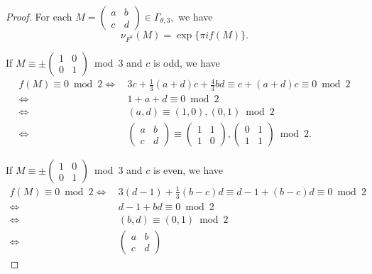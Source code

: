\documentclass[12pt]{article}
\theoremstyle{definition}
\numberwithin{equation}{section}
\numberwithin{theorem}{section}
\begin{document}
\begin{proof}
For each 
$
M
=
\begin{pmatrix}
a & b \\
c & d
\end{pmatrix}
\in
\Gamma_{\theta,3}, 
$ 
we have 
\begin{equation*}
\nu_{F^{k}  }(M)=
\exp
\{\pi i f(M) \}. 
\end{equation*}
\par
If $M \equiv \pm
\begin{pmatrix}
1 & 0 \\
0 & 1
\end{pmatrix}
\bmod{3}
$ 
and $c$ is odd, 
we have 
\begin{align*}
f(M)\equiv 0 \bmod{2}
\Longleftrightarrow& \,
3c+\frac13 (a+d)c+\frac43bd
\equiv c+(a+d)c \equiv 0 \bmod{2} \\
\Longleftrightarrow& \,
1+a+d\equiv 0 \bmod{2} \\
\Longleftrightarrow& \,
(a,d)\equiv (1,0), (0,1) \bmod{2} \\
\Longleftrightarrow& \,
\begin{pmatrix}
a & b \\
c & d
\end{pmatrix}
\equiv 
\begin{pmatrix}
1 & 1 \\
1 & 0
\end{pmatrix},
\begin{pmatrix}
0 & 1 \\
1 & 1
\end{pmatrix}
\bmod{2}. 
\end{align*}
\par
If $M \equiv \pm
\begin{pmatrix}
1 & 0 \\
0 & 1
\end{pmatrix}
\bmod{3}
$ 
and $c$ is even, 
we have 
\begin{align*}
f(M)\equiv 0 \bmod{2}
\Longleftrightarrow& \,
3(d-1)+\frac13(b-c)d
\equiv d-1+(b-c)d \equiv 0 \bmod{2} \\
\Longleftrightarrow& \,
d-1+bd \equiv 0 \bmod{2} \\
\Longleftrightarrow& \,
(b,d)\equiv (0,1) \bmod{2} \\
\Longleftrightarrow& \,
\begin{pmatrix}
a & b \\
c & d
\end{pmatrix}

\end{align*}
\end{proof}
\end{document}
